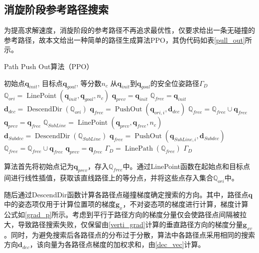 \documentclass[lang=chs, degree=master, blindreview=false, winfonts=true]{yanputhesis}
\begin{document}
\subsection{消旋阶段参考路径搜索}
为提高求解速度，消旋阶段的参考路径不再追求最优性，仅要求给出一条无碰撞的参考路径，故本文给出一种简单的路径生成算法PPO，其伪代码如表\ref{pull_out}所示。
\begin{algorithm}[htb]  
	\caption{Path Push Out算法（PPO）}  
	\label{pull_out}  
	\begin{algorithmic}[1]  
		\Require  
		初始点$\boldsymbol{q}_{init}$,
		目标点$\boldsymbol{q}_{goal}$,
		等分数$n_c$
		\Ensure  
		从$\boldsymbol{q}_{init}$到$\boldsymbol{q}_{goal}$的安全位姿路径$\Gamma_{D}$
		\State $\mathbb{Q}_{ori}=\operatorname{LinePoint}(\boldsymbol{q}_{init},\boldsymbol{q}_{goal},n_c)$
		\State $\boldsymbol{q}_{prev}=\boldsymbol{q}_{init}$
		\State $\mathbb{Q}_{free}=\boldsymbol{q}_{init}$
		\State $\boldsymbol{d}_{dec}=\operatorname{DescendDir}(\mathbb{Q}_{ori})$
		\State $\boldsymbol{q}_{free}=\operatorname{PushOut}(\boldsymbol{q}_{ori,i},\boldsymbol{d}_{dec})$
		\State $\mathbb{Q}_{free}=\mathbb{Q}_{free}\cup \boldsymbol{q}_{free}$
		\State $\boldsymbol{q}_{prev}=\boldsymbol{q}_{free}$
		\Else
		\State $\mathbb{Q}_{SubLine}=\operatorname{LinePoint}(\boldsymbol{q}_{prev},\boldsymbol{q}_{free},n_c)$
		\State $\boldsymbol{d}_{Subdec}=\operatorname{DescendDir}(\mathbb{Q}_{SubLine})$
		\State $\boldsymbol{q}_{free}=\operatorname{PushOut}(\boldsymbol{q}_{SubLine,i},\boldsymbol{d}_{Subdec})$
		\State $\mathbb{Q}_{free}=\mathbb{Q}_{free}\cup \boldsymbol{q}_{free}$
		\EndFor
		\State $\boldsymbol{q}_{prev}=\boldsymbol{q}_{free}$
		\EndIf
		\EndFor
		\State $\Gamma_{D}=\operatorname{LinePath}(\mathbb{Q}_{free})$
		\State \Return $\Gamma_{D}$
	\end{algorithmic}
\end{algorithm}

算法首先将初始点记为$\boldsymbol{q}_{prev}$，存入$\mathbb{Q}_{free}$中。通过LinePoint函数在起始点和目标点间进行线性插值，获取该直线路径上的等分点，并将这些点存入集合$\mathbb{Q}_{ori}$中。

随后通过DescendDir函数计算各路径点碰撞梯度确定搜索的方向。其中，路径点$\boldsymbol{q}$中的姿态项仅用于计算位置项的梯度$\boldsymbol{g}_{x}$，不对姿态项的梯度进行计算，梯度计算公式如\autoref{grad_p}所示。考虑到平行于路径方向的梯度分量仅会使路径点间隔被拉大，导致路径搜索失败，仅保留由\autoref{verti_grad}计算的垂直路径方向的梯度分量$\boldsymbol{g}_{xv}$。同时，为避免搜索后各路径点的分布过于分散，算法中各路径点采用相同的搜索方向$\boldsymbol{d}_{dec}$，该向量为各路径点梯度的加权求和，由\autoref{dec_vec}计算。
\end{document}
